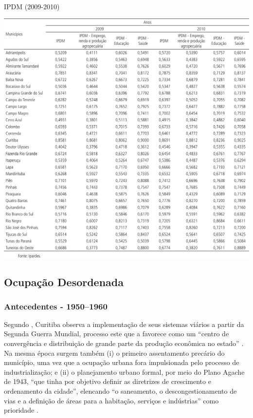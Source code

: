 	\begin{table}
		\centering
		\caption{IPDM (2009-2010)}
		\includegraphics[width=1.0\linewidth]{img/costa2015a_09}
		\label{tab:costa2015a_09}
	\end{table}
	
	\subsection{Ocupação Desordenada}
	
	\subsubsection{Antecedentes - 1950--1960}
	Segundo , Curitiba observa a implementação de seus sistemas viários a partir da Segunda Guerra Mundial, processo este que a favorece como um ``centro de convergência e distribuição de grande parte da produção econômica no estado'' . Na mesma época surgem também (i) o primeiro assentamento precário do município, uma vez que a ocupação urbana fora impulsionada pelo processo de industrialização; e (ii) o planejamento urbano formal, por meio do Plano Agache de 1943, ``que tinha por objetivo definir as diretrizes de crescimento e ordenamento da cidade'', elencando ``o saneamento, o descongestionamento de vias e a definição de áreas para a habitação, serviços e indústrias'' como prioridade \cite[p. 52]{castro2005a}.
	
